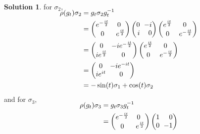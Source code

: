 \documentclass[11pt, a4paper]{report}
\theoremstyle{definition}
\newtheorem{solution}{Solution}[part]
\newenvironment{sol}{\begin{solution}}{\end{solution}\pagebreak[3]}
\newcommand*{\m}{\ensuremath\:\, \mathllap{-}}
\begin{document}
\begin{sol}
for $\sigma_2$,
\begin{align*}
    \SwapAboveDisplaySkip
    \rho(g_t) \sigma_2 &= g_t \sigma_2 g_t^{-1} \\
        &= \begin{pmatrix}
                e^{-\frac{it}{2}} & 0 \;\, \\
                0                 & e^{\frac{it}{2}}
            \end{pmatrix}
            \begin{pmatrix*}[r]
                0 & \m i \\
                i &  0
            \end{pmatrix*}
            \begin{pmatrix}
                e^{\frac{it}{2}} & 0 \; \\
                0                & e^{- \frac{it}{2}}
            \end{pmatrix} \\
        &= \begin{pmatrix}
                0                 & \m ie^{-\frac{it}{2}} \\
                ie^{\frac{it}{2}} & 0
            \end{pmatrix}
            \begin{pmatrix}
                e^{\frac{it}{2}} & 0 \; \\
                0                & e^{-\frac{it}{2}}
            \end{pmatrix} \\
        &= \begin{pmatrix}
                0       & \m ie^{-it} \\
                ie^{it} & 0
            \end{pmatrix} \\
        &= -\sin(t) \sigma_1 + \cos(t) \sigma_2
\end{align*}
and for $\sigma_3$,
\begin{align*}
    \SwapAboveDisplaySkip
    \rho(g_t) \sigma_3 &= g_t \sigma_3 g_t^{-1} \\
        &= \begin{pmatrix}
                e^{-\frac{it}{2}} & 0 \,\,\, \\
                0                 & e^{\frac{it}{2}}
            \end{pmatrix}
            \begin{pmatrix*}[r]
                1 &  0 \\
                0 & \m 1

\end{pmatrix*}
\end{align*}
\end{sol}
\end{document}
